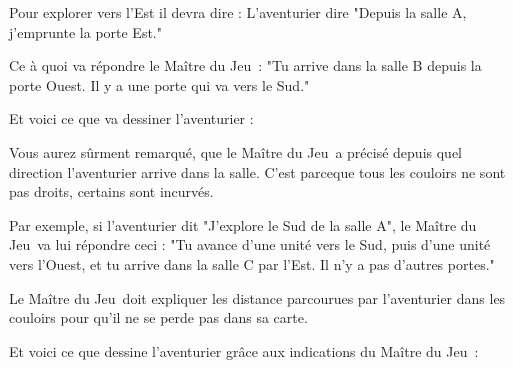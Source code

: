 \documentclass{article}
\newcommand{\mj}{Maître du Jeu}
\begin{document}
        Pour explorer vers l'Est il devra dire :
        L'aventurier dire "Depuis la salle A, j'emprunte la porte Est."

        Ce à quoi va répondre le \mj\ : "Tu arrive dans la salle B depuis la porte Ouest. Il y a une porte qui va vers le Sud."

        Et voici ce que va dessiner l'aventurier : \newline \bigskip

        \noindent {}

        Vous aurez sûrment remarqué, que le \mj\ a précisé depuis quel direction l'aventurier arrive dans la salle. C'est parceque tous les couloirs ne sont pas droits, certains sont incurvés.

        Par exemple, si l'aventurier dit "J'explore le Sud de la salle A",
        le \mj\ va lui répondre ceci : "Tu avance d'une unité vers le Sud, puis d'une unité vers l'Ouest, et tu arrive dans la salle C par l'Est. Il n'y a pas d'autres portes."

        Le \mj\ doit expliquer les distance parcourues par l'aventurier dans les couloirs pour qu'il ne se perde pas dans sa carte.

        Et voici ce que dessine l'aventurier grâce aux indications du \mj\ :

        \noindent {}
\end{document}
